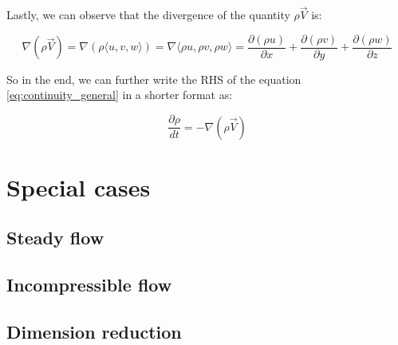 Lastly, we can observe that the divergence of the quantity $\rho \vec{V}$ is:

\begin{equation}
\nabla (\rho \vec{V}) = \nabla (\rho \langle u, v, w \rangle) = \nabla \langle \rho u, \rho v, \rho w \rangle = \frac{\partial (\rho u)}{\partial x} + \frac{\partial (\rho v)}{\partial y} + \frac{\partial (\rho w)}{\partial z}
\end{equation}

So in the end, we can further write the RHS of the equation \ref{eq:continuity_general} in a shorter format as:

\begin{equation} \label{eq:continuity_divergence}
\frac{\partial \rho}{dt} = - \nabla (\rho \vec{V})
\end{equation}





\section{Special cases}

\subsection{Steady flow}

\subsection{Incompressible flow}

\subsection{Dimension reduction}
